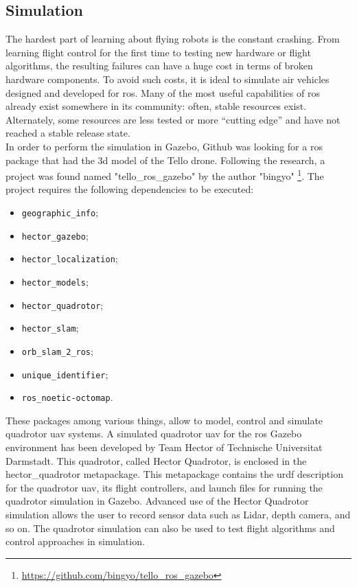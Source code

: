 \subsection{Simulation}
\label{sec:simulation}

The hardest part of learning about flying robots is the constant crashing. From learning flight control for the first time to testing new hardware or flight algorithms, the resulting failures can have a huge cost in terms of broken hardware components. To avoid such costs, it is ideal to simulate air vehicles designed and developed for \gls{ros}.  
Many of the most useful capabilities of \gls{ros} already exist somewhere in its community: often, stable resources exist. Alternately, some resources are less tested or more “cutting edge” and have not reached a stable release state. \\

\noindent In order to perform the simulation in Gazebo, Github was looking for a \gls{ros} package that had the \gls{3d} model of the Tello drone. Following the research, a project was found named "tello\_ros\_gazebo" by the author "bingyo" \footnote{\url{https://github.com/bingyo/tello_ros_gazebo}}. The project requires the following dependencies to be executed:

\begin{itemize}
	\item \texttt{geographic\_info};
	\item \texttt{hector\_gazebo};
	\item \texttt{hector\_localization};
	\item \texttt{hector\_models};
	\item \texttt{hector\_quadrotor};
	\item \texttt{hector\_slam};
	\item \texttt{orb\_slam\_2\_ros};
	\item \texttt{unique\_identifier};
	\item \texttt{ros\_noetic-octomap}.
\end{itemize}

\noindent These packages among various things, allow to model, control and simulate quadrotor \gls{uav} systems. A simulated quadrotor \gls{uav} for the \gls{ros} Gazebo environment has been developed by Team Hector of Technische Universitat Darmstadt. This quadrotor, called Hector Quadrotor, is enclosed in the hector\_quadrotor metapackage. This metapackage contains the \gls{urdf} description for the quadrotor \gls{uav}, its flight controllers, and launch files for running the quadrotor simulation in Gazebo. Advanced use of the Hector Quadrotor simulation allows the user to record sensor data such as Lidar, depth camera, and so on. The quadrotor simulation can also be used to test flight algorithms and control approaches in simulation. \\

